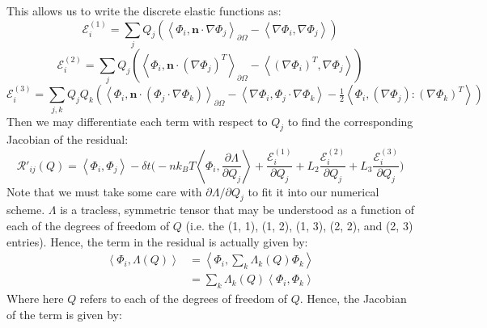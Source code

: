 \documentclass[reqno]{article}
\begin{document}
This allows us to write the discrete elastic functions as:
\begin{equation}
    \mathcal{E}^{(1)}_i
    = \sum_j Q_j \left( 
        \left< \Phi_i, \mathbf{n} \cdot \nabla \Phi_j \right>_{\partial \Omega}
        - \left< \nabla \Phi_i, \nabla \Phi_j \right>
    \right)
\end{equation}
\begin{equation}
    \mathcal{E}^{(2)}_i
    =
    \sum_j Q_j 
    \left(
    \left< \Phi_i, \mathbf{n} \cdot \left( \nabla \Phi_j \right)^T \right>_{\partial \Omega}
    - \left< \left( \nabla \Phi_i \right)^T, \nabla \Phi_j \right>
    \right)
\end{equation}
\begin{equation}
    \mathcal{E}^{(3)}_i
    =
    \sum_{j, k} Q_j Q_k 
    \left(
        \left< \Phi_i, \mathbf{n} \cdot \left( \Phi_j \cdot \nabla \Phi_k \right) \right>_{\partial \Omega}
        - \left< \nabla \Phi_i, \Phi_j \cdot \nabla \Phi_k \right> 
        - \tfrac12 \left< \Phi_i, \left( \nabla \Phi_j \right) : \left( \nabla \Phi_k \right)^T \right>
    \right)
\end{equation}
Then we may differentiate each term with respect to $Q_j$ to find the corresponding Jacobian of the residual:
\begin{equation}
    \mathcal{R}'_{ij}(Q)
    =
    \left<\Phi_i, \Phi_j\right>
    -
    \delta t \biggl(
        - n k_B T \left<\Phi_i, \frac{\partial \Lambda}{\partial Q_j} \right>
        + \frac{\mathcal{E}^{(1)}_i}{\partial Q_j}
        + L_2 \frac{\mathcal{E}^{(2)}_i}{\partial Q_j}
        + L_3 \frac{\mathcal{E}^{(3)}_i}{\partial Q_j}
    \biggr)
\end{equation}
Note that we must take some care with $\partial \Lambda / \partial Q_j$ to fit it into our numerical scheme.
$\Lambda$ is a tracless, symmetric tensor that may be understood as a function of each of the degrees of freedom of $Q$ (i.e. the (1, 1), (1, 2), (1, 3), (2, 2), and (2, 3) entries).
Hence, the term in the residual is actually given by:
\begin{equation}
    \begin{split}
        \left<\Phi_i, \Lambda(Q)\right>
        &= \left<\Phi_i, \sum_k \Lambda_k(Q) \Phi_k \right> \\
        &= \sum_k \Lambda_k(Q) \left<\Phi_i, \Phi_k\right>
    \end{split}
\end{equation}
Where here $Q$ refers to each of the degrees of freedom of $Q$.
Hence, the Jacobian of the term is given by:
\end{document}
